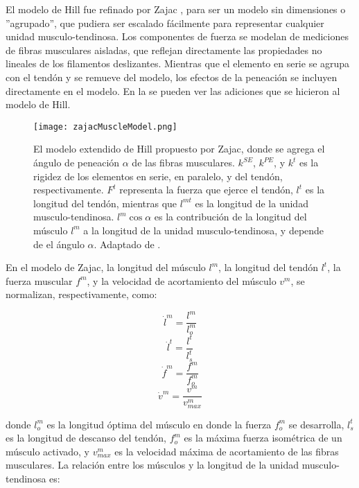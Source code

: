El modelo de Hill fue refinado por Zajac \citep{zajac1989muscle}, para ser un modelo sin dimensiones o ''agrupado'', que pudiera ser escalado fácilmente para representar cualquier unidad musculo-tendinosa. Los componentes de fuerza se modelan de mediciones de fibras musculares aisladas, que reflejan directamente las propiedades no lineales de los filamentos deslizantes. Mientras que el elemento en serie se agrupa con el tendón y se remueve del modelo, los efectos de la peneación se incluyen directamente en el modelo. En la  se pueden ver las adiciones que se hicieron al modelo de Hill.

\begin{figure}[!ht]
	\centering
		\texttt{[image: zajacMuscleModel.png]}
	\caption[Modelo de extendido de músculos de Zajac.]{El modelo extendido de Hill propuesto por Zajac, donde se agrega el ángulo de peneación $\alpha$ de las fibras musculares. $k^{SE}$, $k^{PE}$, y $k^t$ es la rigidez de los elementos en serie, en paralelo, y del tendón, respectivamente. $F^t$ representa la fuerza que ejerce el tendón, $l^t$ es la longitud del tendón, mientras que $l^{mt}$ es la longitud de la unidad musculo-tendinosa. $l^m \cos \alpha$ es la contribución de la longitud del músculo $l^m$ a la longitud de la unidad musculo-tendinosa, y depende de el ángulo $\alpha$. Adaptado de \citep{zajac1989muscle, lee2010survey}.}
	\label{fig:zajacMuscleModel}
\end{figure}

En el modelo de Zajac, la longitud del músculo $l^m$, la longitud del tendón $l^t$, la fuerza muscular $f^m$, y la velocidad de acortamiento del músculo $v^m$, se normalizan, respectivamente, como:

\begin{equation}
	\dot{l}^m = \frac{l^m}{l_o^m}
\end{equation}
\begin{equation}
	\dot{l}^t = \frac{l^t}{l_s^t}
\end{equation}
\begin{equation}
	\dot{f}^m = \frac{f^m}{f_o^m}
\end{equation}
\begin{equation}
	\dot{v}^m = \frac{v^m}{v_{max}^m}
\end{equation}

donde $l_o^m$ es la longitud óptima del músculo en donde la fuerza $f_o^m$ se desarrolla, $l_s^t$ es la longitud de descanso del tendón, $f_o^m$ es la máxima fuerza isométrica de un músculo activado, y $v_{max}^m$ es la velocidad máxima de acortamiento de las fibras musculares. La relación entre los músculos y la longitud de la unidad musculo-tendinosa es:

